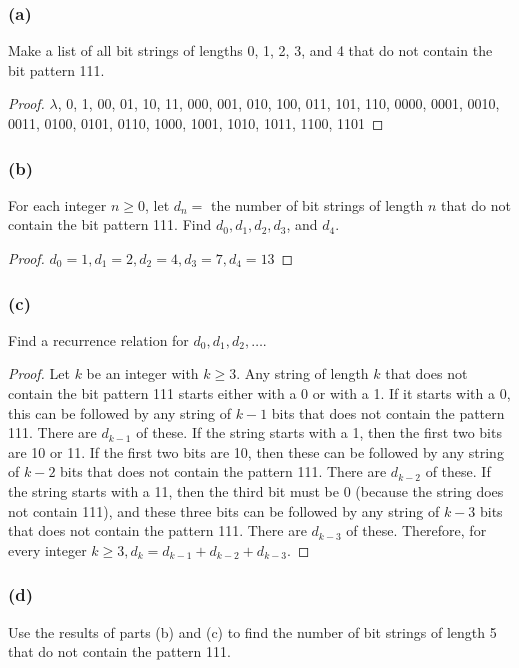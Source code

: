 \documentclass[14pt]{extarticle}
\begin{document}
\subsubsection{(a)}
Make a list of all bit strings of lengths 0, 1, 2, 3, and 4 that do not contain the bit pattern 111.

\begin{proof}
\(\lambda\), 0, 1, 00, 01, 10, 11, 000, 001, 010, 100, 011, 101, 110, 0000, 0001, 0010, 0011, 0100, 0101, 0110, 1000, 1001, 1010, 1011, 1100, 1101
\end{proof}

\subsubsection{(b)}
For each integer \(n \geq 0\), let \(d_n =\) the number of bit strings of length $n$ that do not contain the bit 
pattern 111. Find \(d_0, d_1, d_2, d_3\), and \(d_4\).

\begin{proof}
\(d_0 = 1, d_1 = 2, d_2 = 4, d_3 = 7, d_4 = 13\)
\end{proof}

\subsubsection{(c)}
Find a recurrence relation for \(d_0, d_1, d_2, \ldots\).

\begin{proof}
Let $k$ be an integer with \(k \geq 3\). Any string of length $k$ that does not contain the bit pattern 111 starts 
either with a 0 or with a 1. If it starts with a 0, this can be followed by any string of \(k - 1\) bits that does 
not contain the pattern 111. There are \(d_{k-1}\) of these. If the string starts with a 1, then the first two 
bits are 10 or 11. If the first two bits are 10, then these can be followed by any string of \(k - 2\) bits that does 
not contain the pattern 111. There are \(d_{k-2}\) of these. If the string starts with a 11, then the third bit 
must be 0 (because the string does not contain 111), and these three bits can be followed by any string of \(k - 3\) 
bits that does not contain the pattern 111. There are \(d_{k-3}\) of these. Therefore, for every integer 
\(k \geq 3, d_k = d_{k-1} + d_{k-2} + d_{k-3}\).
\end{proof}

\subsubsection{(d)}
Use the results of parts (b) and (c) to find the number of bit strings of length 5 that do not contain the pattern 
111.
\end{document}
